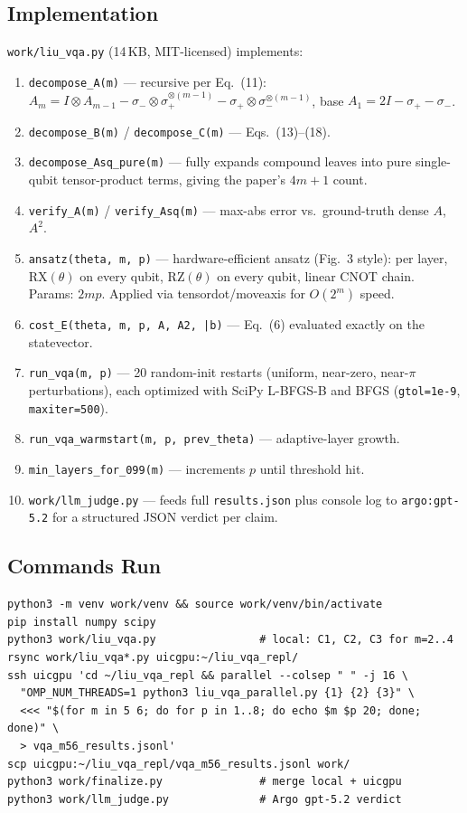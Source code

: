 \documentclass[11pt]{article}
\begin{document}
\subsection{Implementation}
\texttt{work/liu\_vqa.py} (14\,KB, MIT-licensed) implements:
\begin{enumerate}
\item \texttt{decompose\_A(m)} --- recursive per Eq.~(11):
$A_m = I \otimes A_{m-1} - \sigma_- \otimes \sigma_+^{\otimes(m-1)}
- \sigma_+ \otimes \sigma_-^{\otimes(m-1)}$, base
$A_1 = 2I - \sigma_+ - \sigma_-$.
\item \texttt{decompose\_B(m)} / \texttt{decompose\_C(m)} --- Eqs.~(13)--(18).
\item \texttt{decompose\_Asq\_pure(m)} --- fully expands compound leaves into
pure single-qubit tensor-product terms, giving the paper's $4m+1$ count.
\item \texttt{verify\_A(m)} / \texttt{verify\_Asq(m)} --- max-abs error vs.\
ground-truth dense $A$, $A^2$.
\item \texttt{ansatz(theta, m, p)} --- hardware-efficient ansatz (Fig.~3 style):
per layer, RX$(\theta)$ on every qubit, RZ$(\theta)$ on every qubit, linear
CNOT chain. Params: $2mp$. Applied via tensordot/moveaxis for $O(2^m)$ speed.
\item \texttt{cost\_E(theta, m, p, A, A2, |b\rangle)} --- Eq.~(6) evaluated
exactly on the statevector.
\item \texttt{run\_vqa(m, p)} --- 20 random-init restarts (uniform, near-zero,
near-$\pi$ perturbations), each optimized with SciPy L-BFGS-B and BFGS
(\texttt{gtol=1e-9}, \texttt{maxiter=500}).
\item \texttt{run\_vqa\_warmstart(m, p, prev\_theta)} --- adaptive-layer growth.
\item \texttt{min\_layers\_for\_099(m)} --- increments $p$ until threshold hit.
\item \texttt{work/llm\_judge.py} --- feeds full \texttt{results.json} plus
console log to \texttt{argo:gpt-5.2} for a structured JSON verdict per claim.
\end{enumerate}

\subsection{Commands Run}
\begin{lstlisting}[basicstyle=\ttfamily\small,frame=single,breaklines=true]
python3 -m venv work/venv && source work/venv/bin/activate
pip install numpy scipy
python3 work/liu_vqa.py                # local: C1, C2, C3 for m=2..4
rsync work/liu_vqa*.py uicgpu:~/liu_vqa_repl/
ssh uicgpu 'cd ~/liu_vqa_repl && parallel --colsep " " -j 16 \
  "OMP_NUM_THREADS=1 python3 liu_vqa_parallel.py {1} {2} {3}" \
  <<< "$(for m in 5 6; do for p in 1..8; do echo $m $p 20; done; done)" \
  > vqa_m56_results.jsonl'
scp uicgpu:~/liu_vqa_repl/vqa_m56_results.jsonl work/
python3 work/finalize.py               # merge local + uicgpu
python3 work/llm_judge.py              # Argo gpt-5.2 verdict
\end{lstlisting}
\end{document}
